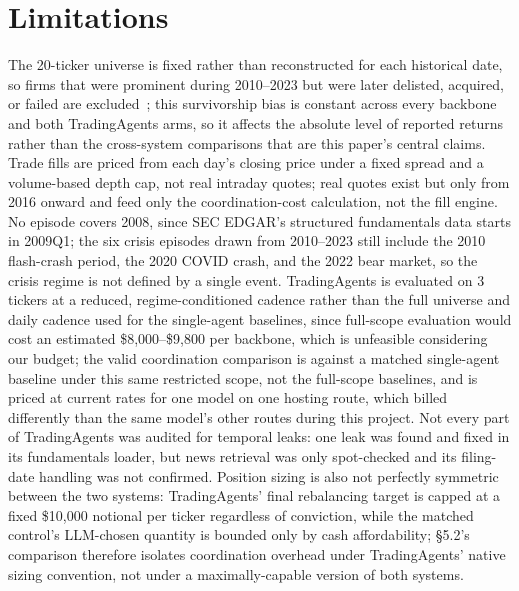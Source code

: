 \documentclass{article}
\begin{document}
\section{Limitations}
The 20-ticker universe is fixed rather than reconstructed for each historical date, so firms that were prominent during 2010--2023 but were later delisted, acquired, or failed are excluded~\cite{brown1992}; this survivorship bias is constant across every backbone and both TradingAgents arms, so it affects the absolute level of reported returns rather than the cross-system comparisons that are this paper's central claims. Trade fills are priced from each day's closing price under a fixed spread and a volume-based depth cap, not real intraday quotes; real quotes exist but only from 2016 onward and feed only the coordination-cost calculation, not the fill engine. No episode covers 2008, since SEC EDGAR's structured fundamentals data starts in 2009Q1; the six crisis episodes drawn from 2010--2023 still include the 2010 flash-crash period, the 2020 COVID crash, and the 2022 bear market, so the crisis regime is not defined by a single event.
TradingAgents is evaluated on 3 tickers at a reduced, regime-conditioned cadence rather than the full universe and daily cadence used for the single-agent baselines, since full-scope evaluation would cost an estimated \$8{,}000--\$9{,}800 per backbone, which is unfeasible considering our budget; the valid coordination comparison is against a matched single-agent baseline under this same restricted scope, not the full-scope baselines, and is priced at current rates for one model on one hosting route, which billed differently than the same model's other routes during this project. Not every part of TradingAgents was audited for temporal leaks: one leak was found and fixed in its fundamentals loader, but news retrieval was only spot-checked and its filing-date handling was not confirmed. Position sizing is also not perfectly symmetric between the two systems: TradingAgents' final rebalancing target is capped at a fixed \$10{,}000 notional per ticker regardless of conviction, while the matched control's LLM-chosen quantity is bounded only by cash affordability; \S5.2's comparison therefore isolates coordination overhead under TradingAgents' native sizing convention, not under a maximally-capable version of both systems.
\begin{ack}
\end{ack}
\end{document}
